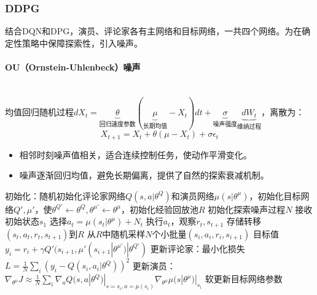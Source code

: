 \documentclass[
12pt, %
a4paper, 
oneside, %
headinclude,footinclude, %
]{scrartcl}
\begin{document}
\subsubsection[DDPG]{DDPG}
结合DQN和DPG，演员、评论家各有主网络和目标网络，一共四个网络。为在确定性策略中保障探索性，引入噪声。
\paragraph{OU（Ornstein-Uhlenbeck）噪声}~\\

均值回归随机过程$ dX_t = \underbrace{\theta}_{\text{回归速度参数}}(\underbrace{\mu}_{\text{长期均值}} - X_t)dt + \underbrace{\sigma}_{\text{噪声强度}} \underbrace{dW_t}_{\text{维纳过程}} $，离散为：
$$ X_{t + 1} = X_t + \theta(\mu - X_t) + \sigma \epsilon_t $$
\begin{itemize}
\item 相邻时刻噪声值相关，适合连续控制任务，使动作平滑变化。
\item 噪声逐渐回归均值，避免长期偏离，提供了自然的探索衰减机制。
\end{itemize}
\begin{myalgorithm}[DDPG]
\State 初始化：随机初始化评论家网络$ Q(s, a|\theta^Q) $和演员网络$ \mu(s|\theta^\mu) $，初始化目标网络$ Q', \mu' $，使$ \theta^{Q'} \gets \theta^Q, \theta^{\mu'} \gets \theta^\mu $，初始化经验回放池$ R $
\State 初始化探索噪声过程$ N $
\State 接收初始状态$ s_1 $
\State 选择$ a_t = \mu(s_t|\theta^\mu) + N_t $ 
\State 执行$ a_t $，观察$ r_t, s_{t + 1} $
\State 存储转移$ (s_t, a_t, r_t, s_{t + 1}) $到$ R $ 
\State 从$ R $中随机采样$ N $个小批量$ (s_i, a_i, r_i, s_{i + 1}) $
\State 目标值$ y_i = r_i + \gamma Q'(s_{i + 1}, \mu'(s_{i + 1}|\theta^{\mu'})|\theta^{Q'}) $ 
\State 更新评论家：最小化损失$ L = \frac{1}{N}\sum_i (y_i - Q(s_i, a_i|\theta^Q))^2 $
\State 更新演员：$\nabla_{\theta^\mu} J \approx \frac{1}{N} \sum_i \nabla_a Q(s, a|\theta^Q)|_{s = s_i, a = \mu(s_i)} \nabla_{\theta^\mu} \mu(s|\theta^\mu)|_{s_i} $
\State 软更新目标网络参数
\EndFor
\EndFor
\end{myalgorithm}
\end{document}
